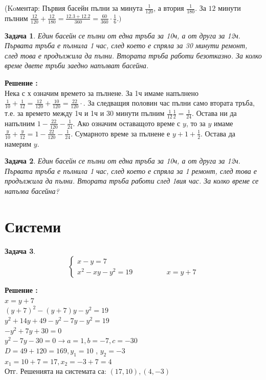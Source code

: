 \documentclass{article}
\newtheorem{problem}{Задача}
\newcounter{solution}
\newcommand\solution{%
	\stepcounter{solution}%
	\textbf{Решение :}\\%
}
\begin{document}
(Koментар: Първия басейн пълни за минута $\frac{1}{120}$, а втория $\frac{1}{180}.$ За $12$ минути пълним $\frac{12}{120} + \frac{12}{180} = \frac{12.3 + 12.2}{360} = \frac{60}{360} \cdot \frac{1}{6}. )$


\begin{problem}
	Един басейн се пълни от една тръба за 10ч, а от друга за 12ч. Първата тръба е пълнила 1 час, след което е спряла за 30 минути ремонт, след това е продължила да пълни. Втората тръба работи безотказно. За колко време двете тръби заедно напълват басейна.
\end{problem}
\solution 
 Нека с х означим времето за пълнене. За 1ч имаме напълнено $\frac{1}{10} + \frac{1}{12} = \frac{12}{120} + \frac{10}{120} = \frac{22}{120} \cdot$. За следващия половин час пълни само втората тръба, т.е. за времето между 1ч и 1ч и 30 минути пълним $\frac{1}{12} \frac{1}{2} = \frac{1}{24}.$ Остава ни да напълним $1 - \frac{22}{120} - \frac{1}{24}.$ Ако означим оставащото време с $y$, то за $y$ имаме $ \frac{y}{10} + \frac{y}{12} =  1 - \frac{22}{120} - \frac{1}{24}$. Сумарното време за пълнене е $y+1+\frac{1}{2}$. Остава да намерим $y$.



\begin{problem}
	Един басейн се пълни от една тръба за 10ч, а от друга за 12ч. Първата тръба е пълнила 1 час, след което е спряла за 1 ремонт, след това е продължила да пълни. Втората тръба работи след 1вия час. За колко време се напълва басейна?
\end{problem}




\section{Системи}

\begin{problem}
	\[
	\begin{cases}
	x - y = 7 \\
	x^2 - xy - y^2=19 \hspace{2cm} x = y + 7 
	\end{cases}
	\]
\end{problem}

\noindent
\solution
$ x = y + 7 $ \\
$ (y+7)^2 - (y+7)y - y^2 = 19 $ \\
$ y^2 + 14y + 49 - y^2 - 7y - y^2 = 19 $ \\
$ -y^2 + 7y + 30 = 0 $ \\ 
$ y^2 - 7y - 30 = 0  \to a = 1, b = -7 , c = -30$ \\ 
$D = 49 + 120 = 169, y_1 = 10$ , $y_2 = -3 $ \\
$x_1 = 10 + 7 = 17, x_2 = -3 + 7 = 4$ \\
Отг. Решенията на системата са: $(17,10) , (4,-3)   $
\end{document}
